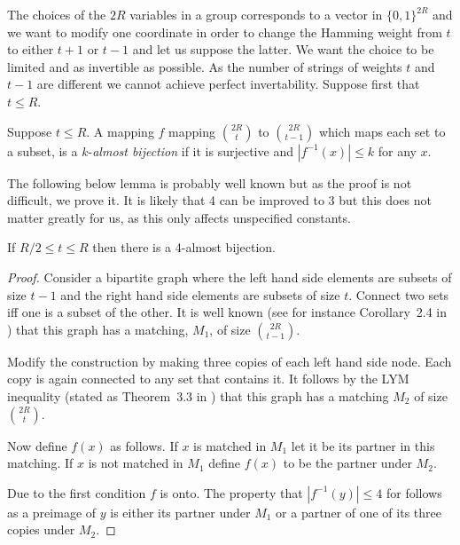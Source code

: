 \documentclass{article}\usepackage[a4paper,margin=20mm]{geometry}
\begin{document}
The choices of the $2R$ variables in
a group corresponds to a vector in $\{ 0, 1 \}^{2R}$ and
we want to modify one coordinate in order to change the Hamming
weight from $t$ to either $t+1$ or $t-1$ and let us suppose the latter.
We want the choice to be limited and as invertible
as possible.  As the number of strings of weights $t$ and
$t-1$ are different we cannot achieve perfect
invertability.   Suppose first that $t \leq R$.

\begin{definition}
Suppose $t \leq R$.  A mapping $f$ mapping 
${{2R} \choose t}$ to ${{2R} \choose {t-1}}$ which
maps each set to a subset,
is a $k$-{\em almost bijection} if
it is surjective and $| f^{-1} (x)| \leq k$ for
any $x$.  
\end{definition}

The following below lemma is probably well known but as the
proof is not difficult, we prove it.  It is likely
that 4 can be improved to 3 but this does not matter greatly for
us, as this only affects unspecified constants.

\begin{lemma}\label{lemma:restrictedchoice}
If $R/2 \leq t \leq R$ then there is a
4-almost bijection.
\end{lemma}

\begin{proof}
Consider a bipartite graph where the left
hand side elements are subsets of size $t-1$ and the right
hand side elements are subsets of size $t$.  Connect
two sets iff one is a subset of the other.  It is well
known (see for instance Corollary~2.4 in \cite{bollobas})
that this graph has
a matching, $M_1$, of size $2R \choose t-1$.

Modify the construction by making three copies of 
each left hand side node.  Each copy is again connected
to any set that contains it.  It follows by
the LYM inequality (stated as Theorem~3.3 in \cite{bollobas})
that this graph has
a matching $M_2$ of size $2R \choose t$.

Now define $f(x)$ as follows.  If $x$ is matched
in $M_1$ let it be its partner in this matching.
If $x$ is not matched in $M_1$ define $f(x)$ to be the
partner under $M_2$.

Due to the first condition $f$ is onto.  The property
that $| f^{-1} (y)| \leq 4$ for follows as
a preimage of $y$ is either its partner under $M_1$
or a partner of one of its three copies under $M_2$.
\end{proof}
\end{document}
